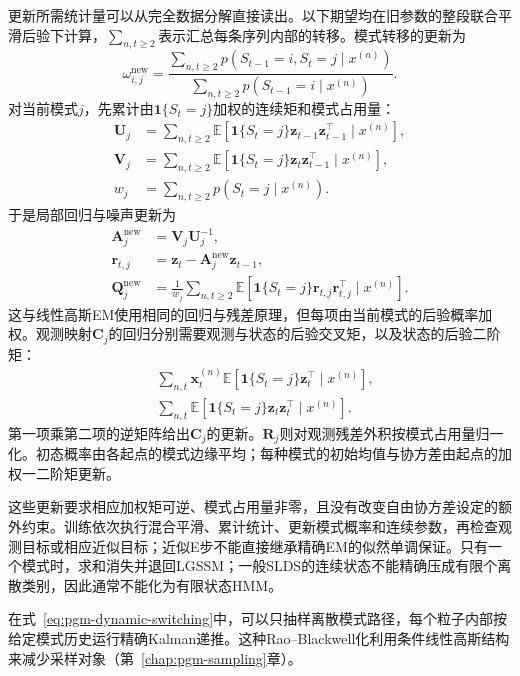 更新所需统计量可以从完全数据分解直接读出。以下期望均在旧参数的整段联合平滑后验下计算，$\sum_{n,t\geq2}$表示汇总每条序列内部的转移。模式转移的更新为
\[
  \omega_{i,j}^{\mathrm{new}}
    =\frac{\sum_{n,t\geq2}p(S_{t-1}=i,S_t=j\mid x^{(n)})}
           {\sum_{n,t\geq2}p(S_{t-1}=i\mid x^{(n)})}.
\]
对当前模式$j$，先累计由$\mathbf1\{S_t=j\}$加权的连续矩和模式占用量：
\[
  \begin{aligned}
    \bm U_j&=\sum_{n,t\geq2}\mathbb E[
       \mathbf1\{S_t=j\}\bm z_{t-1}\bm z_{t-1}^{\top}\mid x^{(n)}],\\
    \bm V_j&=\sum_{n,t\geq2}\mathbb E[
       \mathbf1\{S_t=j\}\bm z_t\bm z_{t-1}^{\top}\mid x^{(n)}],\\
    w_j&=\sum_{n,t\geq2}p(S_t=j\mid x^{(n)}).
  \end{aligned}
\]
于是局部回归与噪声更新为
\begin{equation}
  \begin{aligned}
    \bm A_j^{\mathrm{new}}&=\bm V_j\bm U_j^{-1},\\
    \bm r_{t,j}&=\bm z_t-\bm A_j^{\mathrm{new}}\bm z_{t-1},\\
    \bm Q_j^{\mathrm{new}}
      &=\frac{1}{w_j}\sum_{n,t\geq2}\mathbb E[
       \mathbf1\{S_t=j\}\bm r_{t,j}\bm r_{t,j}^{\top}\mid x^{(n)}].
  \end{aligned}
  \label{eq:pgm-dynamic-switching-update}
\end{equation}
这与线性高斯EM使用相同的回归与残差原理，但每项由当前模式的后验概率加权。观测映射$\bm C_j$的回归分别需要观测与状态的后验交叉矩，以及状态的后验二阶矩：
\[
 \begin{aligned}
  &\sum_{n,t}\bm x_t^{(n)}\mathbb E[
          \mathbf1\{S_t=j\}\bm z_t^{\top}\mid x^{(n)}],\\
  &\sum_{n,t}\mathbb E[
          \mathbf1\{S_t=j\}\bm z_t\bm z_t^{\top}\mid x^{(n)}].
 \end{aligned}
\]
第一项乘第二项的逆矩阵给出$\bm C_j$的更新。$\bm R_j$则对观测残差外积按模式占用量归一化。初态概率由各起点的模式边缘平均；每种模式的初始均值与协方差由起点的加权一二阶矩更新。

这些更新要求相应加权矩可逆、模式占用量非零，且没有改变自由协方差设定的额外约束。训练依次执行混合平滑、累计统计、更新模式概率和连续参数，再检查观测目标或相应近似目标；近似E步不能直接继承精确EM的似然单调保证。只有一个模式时，求和消失并退回LGSSM；一般SLDS的连续状态不能精确压成有限个离散类别，因此通常不能化为有限状态HMM。

在式~\eqref{eq:pgm-dynamic-switching}中，可以只抽样离散模式路径，每个粒子内部按给定模式历史运行精确Kalman递推。这种Rao--Blackwell化利用条件线性高斯结构来减少采样对象（第~\ref{chap:pgm-sampling}章）。

